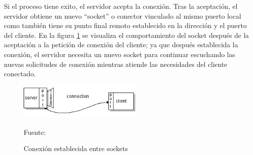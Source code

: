 Si el proceso tiene exito, el servidor acepta la conexión. Tras la aceptación, el servidor obtiene un nuevo ``socket'' o conector vinculado al mismo puerto local como también tiene su punto final remoto establecido en la dirección y el puerto del cliente. En la figura \ref{fig:socket_connection} se visualiza el comportamiento del socket después de la aceptación a la petición de conexión del cliente; ya que después establecida la conexión, el servidor necesita un nuevo socket para continuar escuchando las nuevas solicitudes de conexión mientras atiende las necesidades del cliente conectado.\\

\begin{figure}[H]
    \begin{center}
        \includegraphics[width=6cm]{img/capitulo_2/socket_connection.jpg}
        \caption{Conexión establecida entre sockets\\}
        Fuente: \cite{socketconnection}
        \label{fig:socket_connection}
    \end{center}
    
\end{figure}




